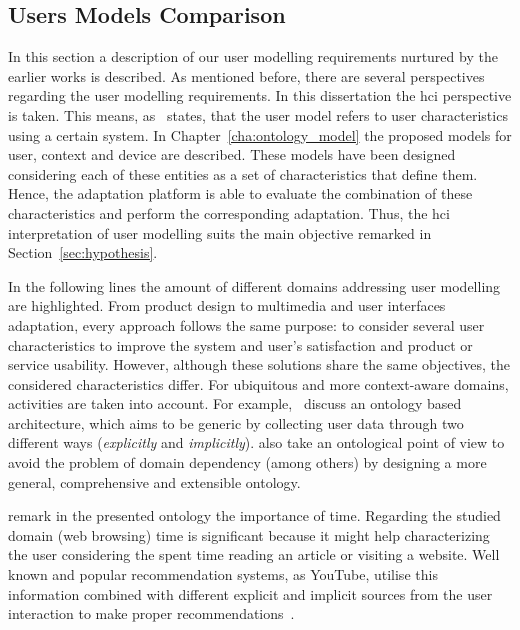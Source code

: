 
\subsection{Users Models Comparison}
\label{sec:user_model_comparison}

In this section a description of our user modelling requirements nurtured by the 
earlier works is described. As mentioned before, there are several perspectives 
regarding the user modelling requirements. In this dissertation the \ac{hci} 
perspective is taken. This means, as~\citet{pohl_logic_based_1999} states, 
that the user model refers to user characteristics using a certain system. 
In Chapter~\ref{cha:ontology_model} the proposed models for user, context and device are described. These models
have been designed considering each of these entities as a set of characteristics
that define them. Hence, the adaptation platform is able to evaluate the
combination of these characteristics and perform the corresponding adaptation.
Thus, the \ac{hci} interpretation of user modelling suits the main objective 
remarked in Section~\ref{sec:hypothesis}.


In the following lines the amount of different domains addressing user modelling 
are highlighted. From product design to multimedia and user interfaces adaptation, 
every approach follows the same purpose: to consider several user characteristics 
to improve the system and user's satisfaction and product or service usability. 
However, although these solutions share the same objectives, the considered 
characteristics differ. For ubiquitous and more context-aware domains, activities 
are taken into account. For example,~\citet{razmerita_ontology_based_2003} 
discuss an ontology based architecture, which aims to be generic by collecting 
user data through two different ways (\textit{explicitly} and \textit{implicitly}).
\citet{golemati_creating_2007} also take an ontological point of view to avoid 
the problem of domain dependency (among others) by designing a more general, 
comprehensive and extensible ontology. 

\citet{gauch_ontology_based_2003} remark in the presented ontology the 
importance of time. Regarding the studied domain (web browsing) time is 
significant because it might help characterizing the user considering the spent 
time reading an article or visiting a website. Well known and popular 
recommendation systems, as YouTube, utilise this information combined with 
different explicit and implicit sources from the user interaction to make proper
recommendations~\citep{davidson_youtube_2010}.

